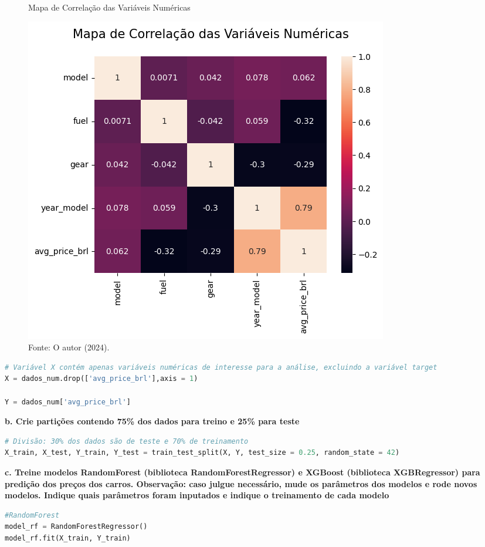 \begin{figure}[H]
\centering
\caption{Mapa de Correlação das Variáveis Numéricas}
\includegraphics[width=.8\linewidth]{apendices/fig/2_IAA002_7.png}
\caption*{Fonte: O autor (2024).}
\end{figure}
\begin{lstlisting}[language=Python, style=input]
# Variável X contém apenas variáveis numéricas de interesse para a análise, excluindo a variável target 
X = dados_num.drop(['avg_price_brl'],axis = 1)

Y = dados_num['avg_price_brl']
\end{lstlisting}


\begin{adjustwidth}{1em}{}
\textbf{b. Crie partições contendo 75\% dos dados para treino e 25\% para teste}
\end{adjustwidth}
\begin{lstlisting}[language=Python, style=input]
# Divisão: 30% dos dados são de teste e 70% de treinamento
X_train, X_test, Y_train, Y_test = train_test_split(X, Y, test_size = 0.25, random_state = 42)
\end{lstlisting}

\begin{adjustwidth}{1em}{}
\textbf{c. Treine modelos RandomForest (biblioteca RandomForestRegressor) e XGBoost (biblioteca XGBRegressor) para predição
dos preços dos carros. \textbf{Observação}: caso julgue necessário, mude os parâmetros dos modelos e rode novos
modelos. Indique quais parâmetros foram inputados e indique o treinamento de cada modelo}
\end{adjustwidth}
\begin{lstlisting}[language=Python, style=input]
#RandomForest
model_rf = RandomForestRegressor()
model_rf.fit(X_train, Y_train)
\end{lstlisting}


